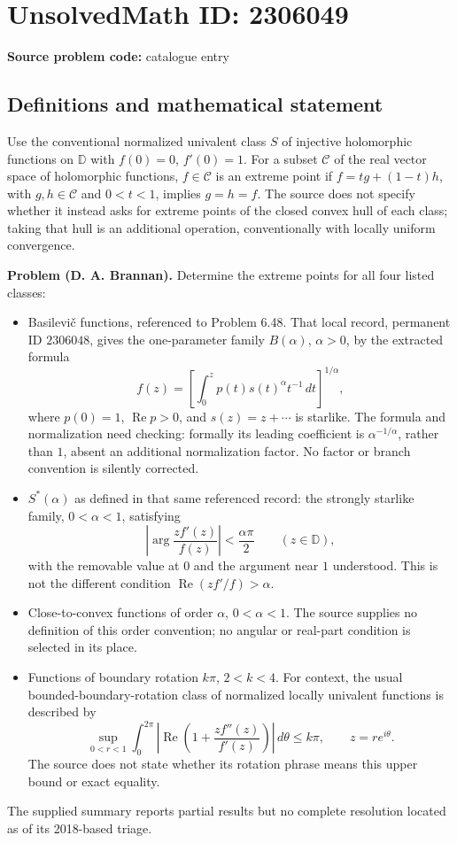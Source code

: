 \documentclass[11pt]{article}
\begin{document}
\section*{UnsolvedMath ID: 2306049}
\textbf{Source problem code:} catalogue entry
\subsection{Definitions and mathematical statement}
Use the conventional normalized univalent class $S$ of injective holomorphic functions on $\mathbb D$ with $f(0)=0$, $f'(0)=1$. For a subset $\mathcal C$ of the real vector space of holomorphic functions, $f\in\mathcal C$ is an extreme point if $f=tg+(1-t)h$, with $g,h\in\mathcal C$ and $0<t<1$, implies $g=h=f$. The source does not specify whether it instead asks for extreme points of the closed convex hull of each class; taking that hull is an additional operation, conventionally with locally uniform convergence.

\textbf{Problem (D. A. Brannan).} Determine the extreme points for all four listed classes:
\begin{itemize}
\item Basilevi\v{c} functions, referenced to Problem 6.48. That local record, permanent ID $2306048$, gives the one-parameter family $B(\alpha)$, $\alpha>0$, by the extracted formula
\[
f(z)=\left[\int_0^z p(t)s(t)^{\alpha}t^{-1}\,dt\right]^{1/\alpha},
\]
where $p(0)=1$, $\operatorname{Re}p>0$, and $s(z)=z+\cdots$ is starlike. The formula and normalization need checking: formally its leading coefficient is $\alpha^{-1/\alpha}$, rather than $1$, absent an additional normalization factor. No factor or branch convention is silently corrected.
\item $S^*(\alpha)$ as defined in that same referenced record: the strongly starlike family, $0<\alpha<1$, satisfying
\[
\left|\arg\frac{zf'(z)}{f(z)}\right|<\frac{\alpha\pi}{2}\qquad(z\in\mathbb D),
\]
with the removable value at $0$ and the argument near $1$ understood. This is not the different condition $\operatorname{Re}(zf'/f)>\alpha$.
\item Close-to-convex functions of order $\alpha$, $0<\alpha<1$. The source supplies no definition of this order convention; no angular or real-part condition is selected in its place.
\item Functions of boundary rotation $k\pi$, $2<k<4$. For context, the usual bounded-boundary-rotation class of normalized locally univalent functions is described by
\[
\sup_{0<r<1}\int_0^{2\pi}\left|\operatorname{Re}\left(1+\frac{zf''(z)}{f'(z)}\right)\right|\,d\theta\leq k\pi,
\qquad z=re^{i\theta}.
\]
The source does not state whether its rotation phrase means this upper bound or exact equality.
\end{itemize}
The supplied summary reports partial results but no complete resolution located as of its 2018-based triage.
\end{document}
